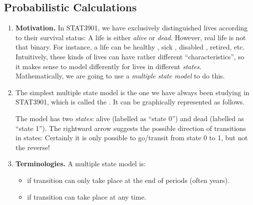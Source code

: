 \subsection{Probabilistic Calculations}
\begin{enumerate}
\item \textbf{Motivation.} In STAT3901, we have exclusively distinguished lives
according to their survival status: A life is either \emph{alive} or
\emph{dead}. However, real life is not that binary. For instance, a life can be
healthy , sick , disabled
, retired, etc. Intuitively, these kinds of lives can have
rather different ``characteristics'', so it makes sense to model differently
for lives in different \emph{states}.  Mathematically, we are going to use a
\emph{multiple state model} to do this.

\item The simplest multiple state model is the one we have always been studying
in STAT3901, which is called the . It can be graphically
represented as follows.
\begin{center}
\end{center}
The model has two \emph{states}: alive (labelled as ``state 0'') and dead
(labelled as ``state 1''). The rightward arrow suggests the possible direction
of transitions in states: Certainly it is only possible to go/transit from
state 0 to 1, but not the reverse!

\item \textbf{Terminologies.} A multiple state model is:
\begin{itemize}
\item {} if transition can only take place at the end of
periods (often years).
\item {} if transition can take place at any time.
\end{itemize}


\end{enumerate}
